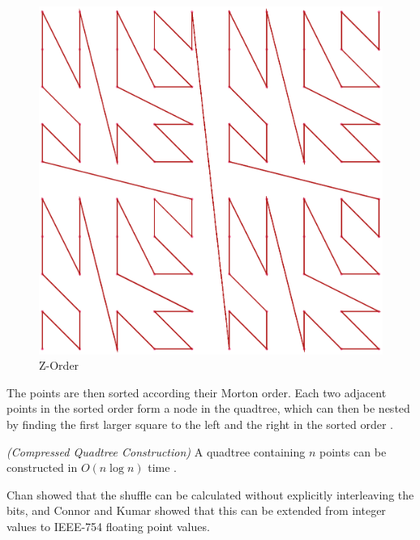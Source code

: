 \documentclass[mcs]{scsthesis}
\begin{document}
\begin{figure}
\begin{center}
\includegraphics[scale=0.35]{diagrams/zorder.eps}
\caption{Z-Order}
\end{center}
\end{figure}

The points are then sorted according their Morton order. Each two adjacent
points in the sorted order form a node in the quadtree, which can then be
nested by finding the first larger square to the left and the right in the
sorted order \cite{bern}.

\begin{thm} \emph{(Compressed Quadtree Construction)}
A quadtree containing $n$ points can be constructed in \(O(n \log n)\) time
\cite{bern}.
\end{thm}

Chan \cite{chan} showed that the shuffle can be calculated without explicitly
interleaving the bits, and Connor and Kumar \cite{connor} showed that this can
be extended from integer values to IEEE-754 floating point values.
\end{document}
